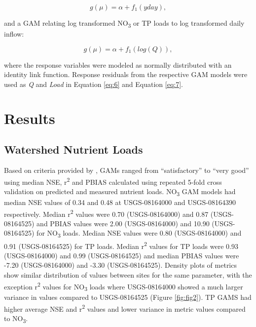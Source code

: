 \documentclass[water,article,submit,oneauthor]{Definitions/mdpi}
\begin{document}
\begin{equation}\label{eq:8}
g(\mu) = \alpha + f_1(yday),
\end{equation}

and a GAM relating log transformed NO\textsubscript{3} or TP loads to
log transformed daily inflow:

\begin{equation}\label{eq:9}
g(\mu) = \alpha + f_1(log(Q)),
\end{equation}

where the response variables were modeled as normally distributed with
an identity link function. Response residuals from the respective GAM
models were used as \emph{Q} and \emph{Load} in Equation \ref{eq:6} and
Equation \ref{eq:7}.

\hypertarget{results}{%
\section{Results}\label{results}}

\hypertarget{watershed-nutrient-loads}{%
\subsection{Watershed Nutrient Loads}\label{watershed-nutrient-loads}}

Based on criteria provided by \citet{moriasiHydrologicWaterQuality2015},
GAMs ranged from ``satisfactory'' to ``very good'' using median NSE,
r\textsuperscript{2} and PBIAS calculated using repeated 5-fold cross
validation on predicted and measured nutrient loads. NO\textsubscript{3}
GAM models had median NSE values of 0.34 and 0.48 at USGS-08164000 and
USGS-08164390 respectively. Median r\textsuperscript{2} values were 0.70
(USGS-08164000) and 0.87 (USGS-08164525) and PBIAS values were 2.00
(USGS-08164000) and 10.90 (USGS-08164525) for NO\textsubscript{3} loads.
Median NSE values were 0.80 (USGS-08164000) and 0.91 (USGS-08164525) for
TP loads. Median r\textsuperscript{2} values for TP loads were 0.93
(USGS-08164000) and 0.99 (USGS-08164525) and median PBIAS values were
-7.20 (USGS-08164000) and -3.30 (USGS-08164525). Density plots of
metrics show similar distribution of values between sites for the same
parameter, with the exception r\textsuperscript{2} values for
NO\textsubscript{3} loads where USGS-08164000 showed a much larger
variance in values compared to USGS-08164525 (Figure \ref{fig:fig2}). TP
GAMS had higher average NSE and r\textsuperscript{2} values and lower
variance in metric values compared to NO\textsubscript{3}.
\end{document}
